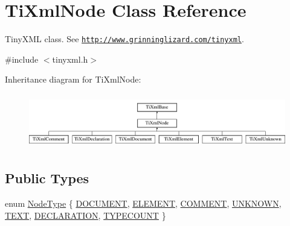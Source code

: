 \hypertarget{class_ti_xml_node}{}\section{Ti\+Xml\+Node Class Reference}
\label{class_ti_xml_node}


Tiny\+X\+ML class. See \href{http://www.grinninglizard.com/tinyxml}{\tt http\+://www.\+grinninglizard.\+com/tinyxml}.  




{\ttfamily \#include $<$tinyxml.\+h$>$}

Inheritance diagram for Ti\+Xml\+Node\+:\begin{figure}[H]
\begin{center}
\leavevmode
\includegraphics[height=2.413793cm]{class_ti_xml_node}
\end{center}
\end{figure}
\subsection*{Public Types}
\begin{DoxyCompactItemize}
\item 
enum \hyperlink{class_ti_xml_node_a836eded4920ab9e9ef28496f48cd95a2}{Node\+Type} \{ \newline
\hyperlink{class_ti_xml_node_a836eded4920ab9e9ef28496f48cd95a2a31b8d14e0558445bb40e36a532b24127}{D\+O\+C\+U\+M\+E\+NT}, 
\hyperlink{class_ti_xml_node_a836eded4920ab9e9ef28496f48cd95a2aaf2344bcea122ef52d47c4dcc357f070}{E\+L\+E\+M\+E\+NT}, 
\hyperlink{class_ti_xml_node_a836eded4920ab9e9ef28496f48cd95a2a7737f35757c7152ca4f612d449ea0e4b}{C\+O\+M\+M\+E\+NT}, 
\hyperlink{class_ti_xml_node_a836eded4920ab9e9ef28496f48cd95a2af521ee2fb1e05705776b28fc55a70037}{U\+N\+K\+N\+O\+WN}, 
\newline
\hyperlink{class_ti_xml_node_a836eded4920ab9e9ef28496f48cd95a2a672617f36c5606a966ac378e6ddc0fd8}{T\+E\+XT}, 
\hyperlink{class_ti_xml_node_a836eded4920ab9e9ef28496f48cd95a2ac02445686c2b72d11385002b3466c28b}{D\+E\+C\+L\+A\+R\+A\+T\+I\+ON}, 
\hyperlink{class_ti_xml_node_a836eded4920ab9e9ef28496f48cd95a2a8334037fb3fe05c67d6110975b38a8bf}{T\+Y\+P\+E\+C\+O\+U\+NT}
 \}
\end{DoxyCompactItemize}
